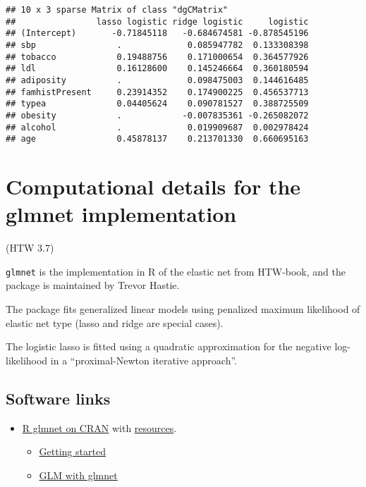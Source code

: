 \documentclass[
]{article}
\providecommand{\tightlist}{%
  \setlength{\itemsep}{0pt}\setlength{\parskip}{0pt}}
\begin{document}
\begin{verbatim}
## 10 x 3 sparse Matrix of class "dgCMatrix"
##                lasso logistic ridge logistic     logistic
## (Intercept)       -0.71845118   -0.684674581 -0.878545196
## sbp                .             0.085947782  0.133308398
## tobacco            0.19488756    0.171000654  0.364577926
## ldl                0.16128600    0.145246664  0.360180594
## adiposity          .             0.098475003  0.144616485
## famhistPresent     0.23914352    0.174900225  0.456537713
## typea              0.04405624    0.090781527  0.388725509
## obesity            .            -0.007835361 -0.265082072
## alcohol            .             0.019909687  0.002978424
## age                0.45878137    0.213701330  0.660695163
\end{verbatim}

\hypertarget{computational-details-for-the-glmnet-implementation}{%
\section{Computational details for the glmnet
implementation}\label{computational-details-for-the-glmnet-implementation}}

(HTW 3.7)

\texttt{glmnet} is the implementation in R of the elastic net from
HTW-book, and the package is maintained by Trevor Hastie.

The package fits generalized linear models using penalized maximum
likelihood of elastic net type (lasso and ridge are special cases).

The logistic lasso is fitted using a quadratic approximation for the
negative log-likelihood in a ``proximal-Newton iterative approach''.

\hypertarget{software-links}{%
\subsection{Software links}\label{software-links}}

\begin{itemize}
\tightlist
\item
  \href{https://cran.r-project.org/web/packages/glmnet/index.html}{R
  glmnet on CRAN} with
  \href{http://www.stanford.edu/~hastie/glmnet}{resources}.

  \begin{itemize}
  \tightlist
  \item
    \href{https://glmnet.stanford.edu/articles/glmnet.html}{Getting
    started}
  \item
    \href{https://glmnet.stanford.edu/articles/glmnetFamily.html}{GLM
    with glmnet}
  \end{itemize}
\end{itemize}
\end{document}
